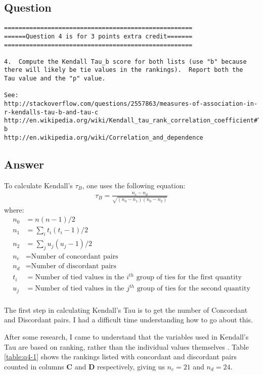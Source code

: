 \documentclass[letterpaper,11pt]{article}
\begin{document}
\subsection*{Question}

\begingroup
\fontsize{8pt}{8pt}\selectfont
\begin{verbatim}
====================================================
======Question 4 is for 3 points extra credit=======
====================================================

4.  Compute the Kendall Tau_b score for both lists (use "b" because
there will likely be tie values in the rankings).  Report both the
Tau value and the "p" value.

See: 
http://stackoverflow.com/questions/2557863/measures-of-association-in-r-kendalls-tau-b-and-tau-c
http://en.wikipedia.org/wiki/Kendall_tau_rank_correlation_coefficient#Tau-b
http://en.wikipedia.org/wiki/Correlation_and_dependence
\end{verbatim}
\endgroup

\newpage
\subsection*{Answer}

To calculate Kendall's $\tau_B$, one uses the following equation\cite{ktaubwikipedia}:
\begin{align*}
\tau_B = \frac{n_c - n_d}{\sqrt{(n_0 - n_1)(n_0 - n_2)}}
\end{align*}
where:
\begin{align*}
n_0 & = n(n-1)/2 \\
n_1 & = \sum_i t_i (t_i - 1)/2 \\
n_2 & = \sum_j u_j (u_j - 1)/2 \\
n_c & = \textrm{Number of concordant pairs} \\
n_d & = \textrm{Number of discordant pairs} \\
t_i & = \textrm{Number of tied values in the $i^{th}$ group of ties for the first quantity} \\
u_j & = \textrm{Number of tied values in the $j^{th}$ group of ties for the second quantity} \\
\end{align*}

The first step in calculating Kendall's Tau is to get the number of Concordant and Discordant pairs.  I had a difficult time understanding how to go about this.

After some research, I came to understand that the variables used in Kendall's Tau are based on ranking, rather than the individual values themselves \cite{ktauyoutube1} \cite{ktauyoutube2} \cite{ktausr}.  Table \ref{table:q4-1} shows the rankings listed with concordant and discordant pairs counted in columns \textbf{C} and \textbf{D} respectively, giving us $n_c = 21$ and $n_d = 24$.
\end{document}

